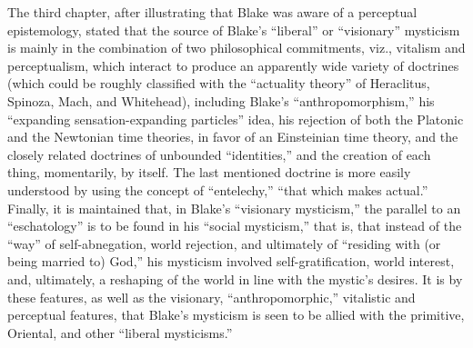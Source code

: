 The third chapter, after illustrating that Blake was aware of a perceptual epistemology, stated that the source of Blake's
\enquote{liberal} or \enquote{visionary} mysticism is mainly in the combination of two philosophical commitments, viz.,
vitalism and perceptualism, which interact to produce an apparently wide variety of doctrines (which could be roughly
classified with the \enquote{actuality theory} of Heraclitus, Spinoza, Mach, and Whitehead), including Blake's \enquote{anthropomorphism,}
his \enquote{expanding sensation-expanding particles} idea, his rejection of both the Platonic and the Newtonian time theories, in favor
of an Einsteinian time theory, and the closely related doctrines of unbounded \enquote{identities,} and the creation
of each thing, momentarily, by itself. The last mentioned doctrine is more easily understood by using the concept of \enquote{entelechy,}
\enquote{that which makes actual.} Finally, it is maintained that, in Blake's  \enquote{visionary mysticism,} the parallel to an \enquote{eschatology} is
to be found in his \enquote{social mysticism,} that is, that instead of the \enquote{way} of self-abnegation, world rejection, and ultimately of
\enquote{residing with (or being married to) God,} his mysticism involved self-gratification, world interest, and, ultimately, a
reshaping of the world in line with the mystic's desires. It is by these features, as well as the visionary, \enquote{anthropomorphic,}
vitalistic and perceptual features, that Blake's mysticism is seen to be allied with the primitive, Oriental, and other \enquote{liberal mysticisms.}